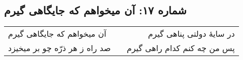 \begin{center}
\section*{شماره ۱۷: آن میخواهم که جایگاهی گیرم}
\label{sec:017}
\begin{longtable}{l p{0.5cm} r}
آن میخواهم که جایگاهی گیرم
&&
در سایهٔ دولتی پناهی گیرم
\\
صد راه ز هر ذرّه چو بر میخیزد
&&
پس من چه کنم کدام راهی گیرم
\\
\end{longtable}
\end{center}
